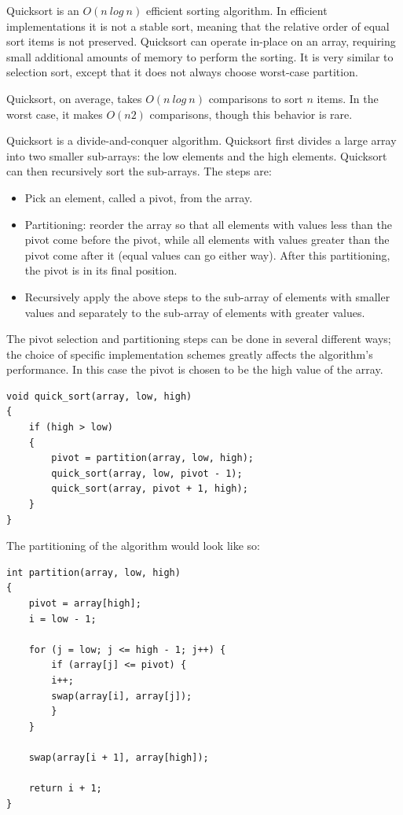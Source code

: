\documentclass{article}
\begin{document}
Quicksort is an $O(n\ log\ n)$ efficient sorting algorithm. In efficient implementations it is not a stable sort, meaning that the relative order of equal sort items is not preserved. Quicksort can operate in-place on an array, requiring small additional amounts of memory to perform the sorting. It is very similar to selection sort, except that it does not always choose worst-case partition.

Quicksort, on average, takes $O(n\ log\ n)$ comparisons to sort $n$ items. In the worst case, it makes $O(n2)$ comparisons, though this behavior is rare.

Quicksort is a divide-and-conquer algorithm. Quicksort first divides a large array into two smaller sub-arrays: the low elements and the high elements. Quicksort can then recursively sort the sub-arrays. The steps are:
\begin{itemize}
\item Pick an element, called a pivot, from the array.
\item Partitioning: reorder the array so that all elements with values less than the pivot come before the pivot, while all elements with values greater than the pivot come after it (equal values can go either way). After this partitioning, the pivot is in its final position.
\item Recursively apply the above steps to the sub-array of elements with smaller values and separately to the sub-array of elements with greater values.
\end{itemize}

The pivot selection and partitioning steps can be done in several different ways; the choice of specific implementation schemes greatly affects the algorithm's performance. In this case the pivot is chosen to be the high value of the array.

\begin{lstlisting}
void quick_sort(array, low, high)
{
	if (high > low)
	{
	    pivot = partition(array, low, high);
	    quick_sort(array, low, pivot - 1);
	    quick_sort(array, pivot + 1, high);
	}
}
\end{lstlisting}

The partitioning of the algorithm would look like so:

\begin{lstlisting}
int partition(array, low, high)
{
	pivot = array[high];
	i = low - 1;

	for (j = low; j <= high - 1; j++) {
	    if (array[j] <= pivot) {
		i++;
		swap(array[i], array[j]);
	    }
	}

	swap(array[i + 1], array[high]);

	return i + 1;
}
\end{lstlisting}
\end{document}
